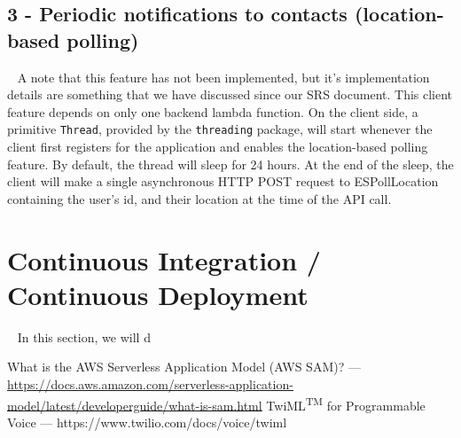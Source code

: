 \documentclass[10pt, a4paper]{article}
\begin{document}
\subsection{3 - Periodic notifications to contacts (location-based polling)}
\par ~ A note that this feature has not been implemented, but it's implementation details are something that we have discussed since our SRS document. This client feature depends on only one backend lambda function. On the client side, a primitive \texttt{Thread}, provided by the \texttt{threading} package, will start whenever the client first registers for the application and enables the location-based polling feature. By default, the thread will sleep for 24 hours. At the end of the sleep, the client will make a single asynchronous HTTP POST request to ESPollLocation containing the user's id, and their location at the time of the API call.  
\section{Continuous Integration / Continuous Deployment}
\label{sec:cicd}
\par ~ In this section, we will d


\begin{thebibliography}{9}
What is the AWS Serverless Application Model (AWS SAM)? --- \url{https://docs.aws.amazon.com/serverless-application-model/latest/developerguide/what-is-sam.html}
TwiML\textsuperscript{TM} for Programmable Voice --- https://www.twilio.com/docs/voice/twiml

\end{thebibliography}
\end{document}
